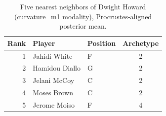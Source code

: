 \begin{table}[htbp]
  \centering\small
  \begin{tabular}{rllc}
    \toprule
    Rank & Player & Position & Archetype \\
    \midrule
    1 & Jahidi White & F & 2 \\
    2 & Hamidou Diallo & G & 2 \\
    3 & Jelani McCoy & C & 2 \\
    4 & Moses Brown & C & 2 \\
    5 & Jerome Moiso & F & 4 \\
    \bottomrule
  \end{tabular}
  \caption{Five nearest neighbors of Dwight Howard (curvature_m1 modality), Procrustes-aligned posterior mean.}
  \label{tab:Dwight_Howard_neighbors_curvature_m1}
\end{table}

